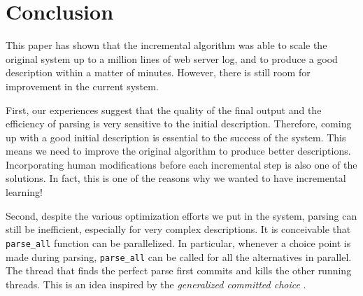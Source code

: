 \section{Conclusion}
\label{sec:conclude}
This paper has shown that the incremental 
algorithm was able to scale the original
\learnpads{} system up to a million
lines of web server log, and to produce a good
description within a matter of minutes.
However, there is still room for improvement in the
current system. 

First, our experiences suggest that
the quality of the final output and the efficiency
of parsing is very sensitive to the initial
description. Therefore, coming up with a good
initial description is essential to the success
of the system. This means we need to improve the
original \learnpads{} algorithm to produce better
descriptions.
Incorporating human modifications 
before each incremental step is also one of the solutions.
In fact, this is one of the reasons why we wanted to
have incremental learning!


Second, despite the various optimization efforts we put in
the system, parsing can still be inefficient, 
especially for very complex descriptions.
It is conceivable that 
{\tt parse\_all} function can be parallelized. In
particular, whenever a choice point is made during
parsing, {\tt parse\_all}
can be called for all the alternatives in
parallel. The thread that finds the perfect
parse first commits and kills the other running threads.
This is an idea inspired by the {\em generalized committed 
choice} \cite{JaffarYZ07:gcc}. 
 

